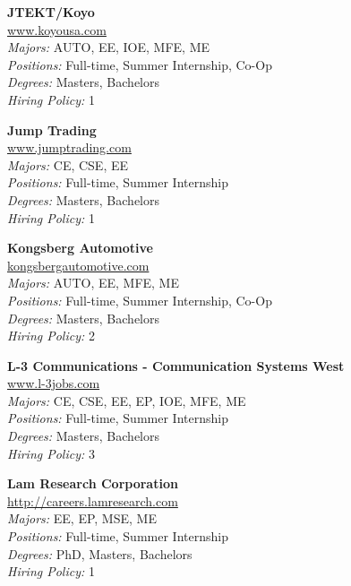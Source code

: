 \documentclass[twoside]{article}
\begin{document}
\begin{center}
\begin{multicols}{3}
\begin{minipage}{.9\columnwidth}{\Large\bf JTEKT/Koyo }\\
	\url{www.koyousa.com}\\
	\emph{Majors:} AUTO, EE, IOE, MFE, ME\\
	\emph{Positions:} Full-time, Summer Internship, Co-Op\\
	\emph{Degrees:} Masters, Bachelors\\
	\emph{Hiring Policy:} 1\\
\end{minipage}
 
\begin{minipage}{.9\columnwidth}{\Large\bf Jump Trading }\\
	\url{www.jumptrading.com}\\
	\emph{Majors:} CE, CSE, EE\\
	\emph{Positions:} Full-time, Summer Internship\\
	\emph{Degrees:} Masters, Bachelors\\
	\emph{Hiring Policy:} 1\\
\end{minipage}
 
\begin{minipage}{.9\columnwidth}{\Large\bf Kongsberg Automotive }\\
	\url{kongsbergautomotive.com}\\
	\emph{Majors:} AUTO, EE, MFE, ME\\
	\emph{Positions:} Full-time, Summer Internship, Co-Op\\
	\emph{Degrees:} Masters, Bachelors\\
	\emph{Hiring Policy:} 2\\
\end{minipage}
 
\begin{minipage}{.9\columnwidth}{\Large\bf L-3 Communications - Communication Systems West }\\
	\url{www.l-3jobs.com}\\
	\emph{Majors:} CE, CSE, EE, EP, IOE, MFE, ME\\
	\emph{Positions:} Full-time, Summer Internship\\
	\emph{Degrees:} Masters, Bachelors\\
	\emph{Hiring Policy:} 3\\
\end{minipage}
 
\begin{minipage}{.9\columnwidth}{\Large\bf Lam Research Corporation }\\
	\url{http://careers.lamresearch.com}\\
	\emph{Majors:} EE, EP, MSE, ME\\
	\emph{Positions:} Full-time, Summer Internship\\
	\emph{Degrees:} PhD, Masters, Bachelors\\
	\emph{Hiring Policy:} 1\\
\end{minipage}
 

\end{multicols}
\end{center}
\end{document}

